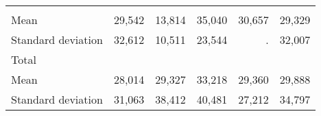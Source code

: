 \begin{tabular}{llllll}
  \multicolumn{1}{r}{} &
  \multicolumn{1}{r}{} &
  \multicolumn{1}{r}{} \\
\multicolumn{1}{l}{\hspace{4em}Mean} &
  \multicolumn{1}{|r}{29,542} &
  \multicolumn{1}{r}{13,814} &
  \multicolumn{1}{r}{35,040} &
  \multicolumn{1}{r}{30,657} &
  \multicolumn{1}{r}{29,329} \\
\multicolumn{1}{l}{\hspace{4em}Standard deviation} &
  \multicolumn{1}{|r}{32,612} &
  \multicolumn{1}{r}{10,511} &
  \multicolumn{1}{r}{23,544} &
  \multicolumn{1}{r}{.} &
  \multicolumn{1}{r}{32,007} \\
\multicolumn{1}{l}{\hspace{3em}Total} &
  \multicolumn{1}{|r}{} &
  \multicolumn{1}{r}{} &
  \multicolumn{1}{r}{} &
  \multicolumn{1}{r}{} &
  \multicolumn{1}{r}{} \\
\multicolumn{1}{l}{\hspace{4em}Mean} &
  \multicolumn{1}{|r}{28,014} &
  \multicolumn{1}{r}{29,327} &
  \multicolumn{1}{r}{33,218} &
  \multicolumn{1}{r}{29,360} &
  \multicolumn{1}{r}{29,888} \\
\multicolumn{1}{l}{\hspace{4em}Standard deviation} &
  \multicolumn{1}{|r}{31,063} &
  \multicolumn{1}{r}{38,412} &
  \multicolumn{1}{r}{40,481} &
  \multicolumn{1}{r}{27,212} &
  \multicolumn{1}{r}{34,797} \\
\cline{1-6}
\end{tabular}

